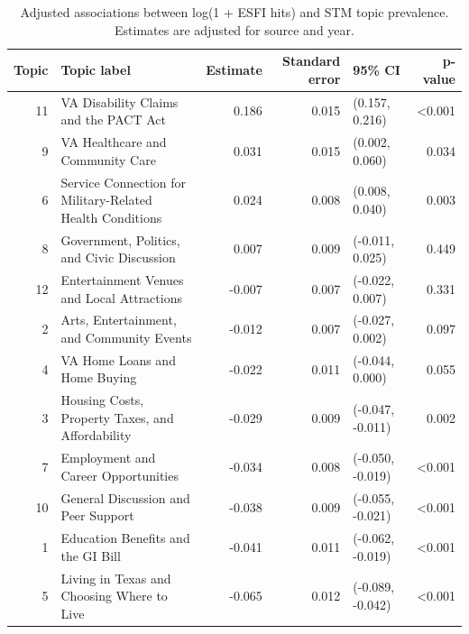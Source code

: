 \begin{table}

\caption{Adjusted associations between log(1 + ESFI hits) and STM topic prevalence. Estimates are adjusted for source and year.}
\centering
\begin{tabular}[t]{rlrrlr}
\toprule
Topic & Topic label & Estimate & Standard error & 95\% CI & p-value\\
\midrule
11 & VA Disability Claims and the PACT Act & 0.186 & 0.015 & (0.157, 0.216) & <0.001\\
9 & VA Healthcare and Community Care & 0.031 & 0.015 & (0.002, 0.060) & 0.034\\
6 & Service Connection for Military-Related Health Conditions & 0.024 & 0.008 & (0.008, 0.040) & 0.003\\
8 & Government, Politics, and Civic Discussion & 0.007 & 0.009 & (-0.011, 0.025) & 0.449\\
12 & Entertainment Venues and Local Attractions & -0.007 & 0.007 & (-0.022, 0.007) & 0.331\\
2 & Arts, Entertainment, and Community Events & -0.012 & 0.007 & (-0.027, 0.002) & 0.097\\
4 & VA Home Loans and Home Buying & -0.022 & 0.011 & (-0.044, 0.000) & 0.055\\
3 & Housing Costs, Property Taxes, and Affordability & -0.029 & 0.009 & (-0.047, -0.011) & 0.002\\
7 & Employment and Career Opportunities & -0.034 & 0.008 & (-0.050, -0.019) & <0.001\\
10 & General Discussion and Peer Support & -0.038 & 0.009 & (-0.055, -0.021) & <0.001\\
1 & Education Benefits and the GI Bill & -0.041 & 0.011 & (-0.062, -0.019) & <0.001\\
5 & Living in Texas and Choosing Where to Live & -0.065 & 0.012 & (-0.089, -0.042) & <0.001\\
\bottomrule
\end{tabular}
\end{table}
